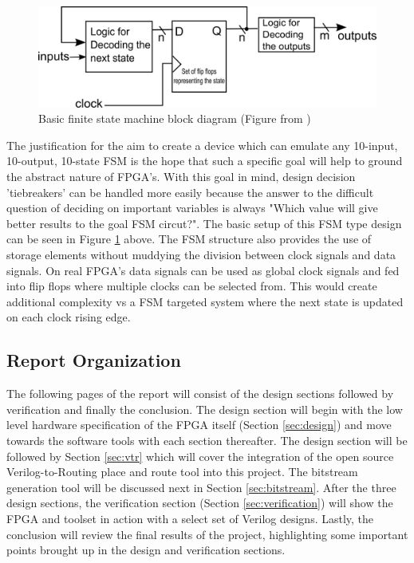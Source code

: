 \documentclass[12pt]{article}
\begin{document}
\begin{figure}[ht]
  \centering
  \includegraphics[width=.7\textwidth]{fsm}
  \caption{Basic finite state machine block diagram (Figure from \cite{fsm})}
  \label{fig:fsm}
\end{figure}

The justification for the aim to create a device which can emulate any 10-input, 10-output,
10-state FSM is the hope that such a specific goal will help to ground the abstract
nature of FPGA's. With this goal in mind, design decision 'tiebreakers' can be
handled more easily because the answer to the difficult question of deciding on important
variables is always "Which value will give better results to the goal FSM circut?".
The basic setup of this FSM type design can be seen in Figure \ref{fig:fsm} above.
The FSM structure also provides the use of storage elements without muddying the division
between clock signals and data signals. On real FPGA's data signals can be used as global
clock signals and fed into flip flops where multiple clocks can be selected from. This
would create additional complexity vs a FSM targeted system where the next state is
updated on each clock rising edge.

\subsection{Report Organization}

The following pages of the report will consist of the design sections followed by
verification and finally the conclusion. The design section will begin with the
low level hardware specification of the FPGA itself (Section \ref{sec:design}) and
move towards the software tools with each section thereafter. The design section
will be followed by Section \ref{sec:vtr} which will cover the integration of the open source
Verilog-to-Routing place and route tool into this project. The bitstream generation tool will be discussed
next in Section \ref{sec:bitstream}. After the three design sections, the verification
section (Section \ref{sec:verification}) will show the FPGA and toolset in action with
a select set of Verilog designs. Lastly, the
conclusion will review the final results of the project, highlighting some important
points brought up in the design and verification sections.
\end{document}
